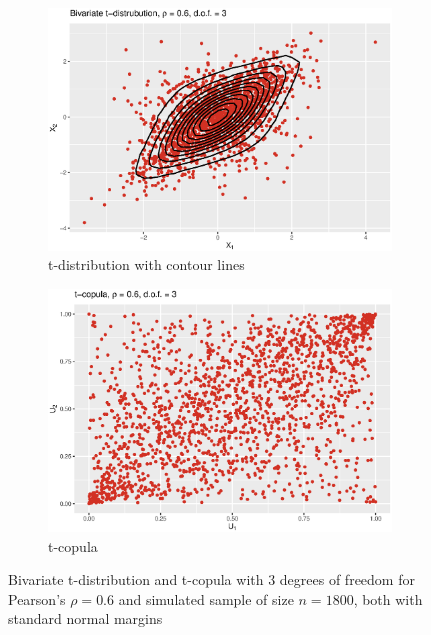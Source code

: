  \begin{figure}[H]
\centering
\begin{subfigure}{.45\textwidth}
  \centering
  \includegraphics[width=\linewidth]{figures/bivariate_t.eps}
  \caption{t-distribution with contour lines}
  \label{fig:bivariate_t}
\end{subfigure}
\begin{subfigure}{.45\textwidth}
  \centering
  \includegraphics[width=\linewidth]{figures/t_copula.eps}
  \caption{t-copula}
  \label{fig:t_copula}
\end{subfigure}
\caption{Bivariate t-distribution and t-copula with 3 degrees of freedom for Pearson's $\rho = 0.6$ and simulated sample of size $n = 1800$, both with standard normal margins}
\label{fig:t_plots}
\end{figure}







